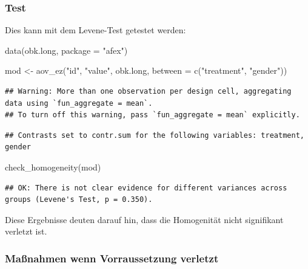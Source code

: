 \documentclass[
]{book}
\newenvironment{Shaded}{\begin{snugshade}}{\end{snugshade}}
\newcommand{\AttributeTok}[1]{\textcolor[rgb]{0.77,0.63,0.00}{#1}}
\newcommand{\FunctionTok}[1]{\textcolor[rgb]{0.00,0.00,0.00}{#1}}
\newcommand{\NormalTok}[1]{#1}
\newcommand{\OtherTok}[1]{\textcolor[rgb]{0.56,0.35,0.01}{#1}}
\newcommand{\StringTok}[1]{\textcolor[rgb]{0.31,0.60,0.02}{#1}}
\begin{document}
\hypertarget{test}{%
\subsubsection{Test}\label{test}}

Dies kann mit dem Levene-Test getestet werden:

\begin{Shaded}
\begin{Highlighting}[]
\FunctionTok{data}\NormalTok{(obk.long, }\AttributeTok{package =} \StringTok{"afex"}\NormalTok{)}

\NormalTok{mod }\OtherTok{\textless{}{-}} \FunctionTok{aov\_ez}\NormalTok{(}\StringTok{"id"}\NormalTok{, }\StringTok{"value"}\NormalTok{, obk.long, }
             \AttributeTok{between =} \FunctionTok{c}\NormalTok{(}\StringTok{"treatment"}\NormalTok{, }\StringTok{"gender"}\NormalTok{))}
\end{Highlighting}
\end{Shaded}

\begin{verbatim}
## Warning: More than one observation per design cell, aggregating data using `fun_aggregate = mean`.
## To turn off this warning, pass `fun_aggregate = mean` explicitly.
\end{verbatim}

\begin{verbatim}
## Contrasts set to contr.sum for the following variables: treatment, gender
\end{verbatim}

\begin{Shaded}
\begin{Highlighting}[]
\FunctionTok{check\_homogeneity}\NormalTok{(mod)}
\end{Highlighting}
\end{Shaded}

\begin{verbatim}
## OK: There is not clear evidence for different variances across groups (Levene's Test, p = 0.350).
\end{verbatim}

Diese Ergebnisse deuten darauf hin, dass die Homogenität nicht signifikant verletzt ist.

\hypertarget{mauxdfnahmen-wenn-vorraussetzung-verletzt}{%
\subsubsection{Maßnahmen wenn Vorraussetzung verletzt}\label{mauxdfnahmen-wenn-vorraussetzung-verletzt}}
\end{document}
